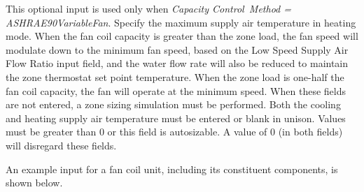 This optional input is used only when \emph{Capacity Control~Method = ASHRAE90VariableFan}. Specify the maximum supply air temperature in heating mode. When the fan coil capacity is greater than the zone load, the fan speed will modulate down to the minimum fan speed, based on the Low Speed Supply Air Flow Ratio input field, and the water flow rate will also be reduced to maintain the zone thermostat set point temperature. When the zone load is one-half the fan coil capacity, the fan will operate at the minimum speed. When these fields are not entered, a zone sizing simulation must be performed. Both the cooling and heating supply air temperature must be entered or blank in unison. Values must be greater than 0 or this field is autosizable. A value of 0 (in both fields) will disregard these fields.

An example input for a fan coil unit, including its constituent components, is shown below.

